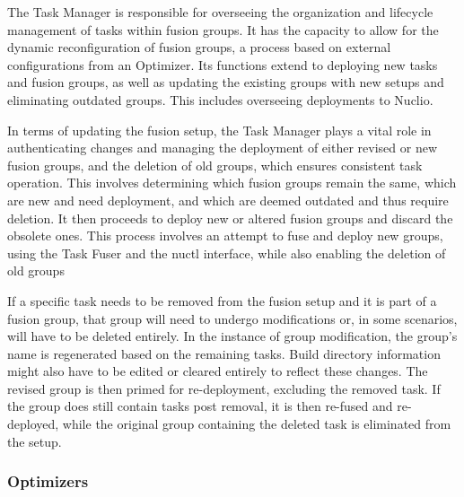 The Task Manager is responsible for overseeing the organization and lifecycle
management of tasks within fusion groups. It has the capacity to allow for the
dynamic reconfiguration of fusion groups, a process based on external
configurations from an Optimizer. Its functions extend to deploying new tasks
and fusion groups, as well as updating the existing groups with new setups and
eliminating outdated groups. This includes overseeing deployments to Nuclio.

In terms of updating the fusion setup, the Task Manager plays a vital role in
authenticating changes and managing the deployment of either revised or new
fusion groups, and the deletion of old groups, which ensures consistent task
operation. This involves determining which fusion groups remain the same, which
are new and need deployment, and which are deemed outdated and thus require
deletion. It then proceeds to deploy new or altered fusion groups and discard
the obsolete ones. This process involves an attempt to fuse and deploy new
groups, using the Task Fuser and the nuctl interface, while also enabling the
deletion of old groups

If a specific task needs to be removed from the fusion setup and it is part of a
fusion group, that group will need to undergo modifications or, in some
scenarios, will have to be deleted entirely. In the instance of group
modification, the group's name is regenerated based on the remaining tasks.
Build directory information might also have to be edited or cleared entirely to
reflect these changes. The revised group is then primed for re-deployment,
excluding the removed task. If the group does still contain tasks post removal,
it is then re-fused and re-deployed, while the original group containing the
deleted task is eliminated from the setup.

\subsubsection{Optimizers}


